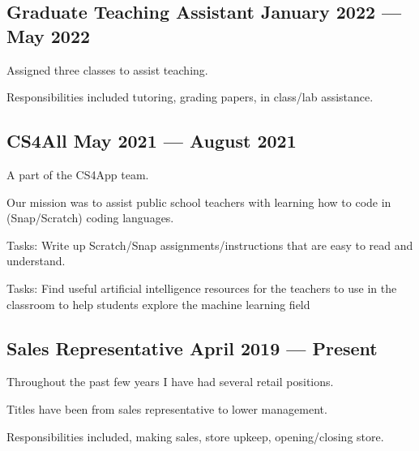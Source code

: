\documentclass[letter,10pt]{article}
\begin{document}
\subsection{{Graduate Teaching Assistant \hfill January 2022 --- May 2022}}
\begin{zitemize}
\item Assigned three classes to assist teaching.
\item Responsibilities included tutoring, grading papers, in class/lab assistance.
\end{zitemize}

\subsection{{CS4All \hfill May 2021 --- August 2021}}
\begin{zitemize}
\item A part of the CS4App team.
\item Our mission was to assist public school teachers with learning how to code in (Snap/Scratch) coding languages.
\item Tasks: Write up Scratch/Snap assignments/instructions that are easy to read and understand.
\item Tasks: Find useful artificial intelligence resources for the teachers to use in the classroom to help students explore the machine learning field
\end{zitemize}

\subsection{{Sales Representative \hfill April 2019 --- Present}}
\begin{zitemize}
\item Throughout the past few years I have had several retail positions.
\item Titles have been from sales representative to lower management.
\item Responsibilities included, making sales, store upkeep, opening/closing store.
\end{zitemize}
\end{document}
